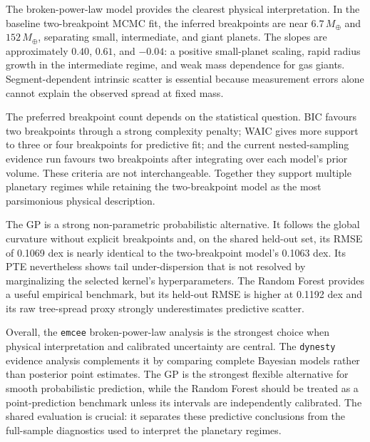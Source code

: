 \documentclass{article}
\numberwithin{equation}{section}
\begin{document}
The broken-power-law model provides the clearest physical interpretation. In the baseline two-breakpoint MCMC fit, the inferred breakpoints are near $6.7\,M_\oplus$ and $152\,M_\oplus$, separating small, intermediate, and giant planets. The slopes are approximately $0.40$, $0.61$, and $-0.04$: a positive small-planet scaling, rapid radius growth in the intermediate regime, and weak mass dependence for gas giants. Segment-dependent intrinsic scatter is essential because measurement errors alone cannot explain the observed spread at fixed mass.

The preferred breakpoint count depends on the statistical question. BIC favours two breakpoints through a strong complexity penalty; WAIC gives more support to three or four breakpoints for predictive fit; and the current nested-sampling evidence run favours two breakpoints after integrating over each model's prior volume. These criteria are not interchangeable. Together they support multiple planetary regimes while retaining the two-breakpoint model as the most parsimonious physical description.

The GP is a strong non-parametric probabilistic alternative. It follows the global curvature without explicit breakpoints and, on the shared held-out set, its RMSE of 0.1069 dex is nearly identical to the two-breakpoint model's 0.1063 dex. Its PTE nevertheless shows tail under-dispersion that is not resolved by marginalizing the selected kernel's hyperparameters. The Random Forest provides a useful empirical benchmark, but its held-out RMSE is higher at 0.1192 dex and its raw tree-spread proxy strongly underestimates predictive scatter.

Overall, the \texttt{emcee} broken-power-law analysis is the strongest choice when physical interpretation and calibrated uncertainty are central. The \texttt{dynesty} evidence analysis complements it by comparing complete Bayesian models rather than posterior point estimates. The GP is the strongest flexible alternative for smooth probabilistic prediction, while the Random Forest should be treated as a point-prediction benchmark unless its intervals are independently calibrated. The shared evaluation is crucial: it separates these predictive conclusions from the full-sample diagnostics used to interpret the planetary regimes.

\printbibliography
\end{document}
